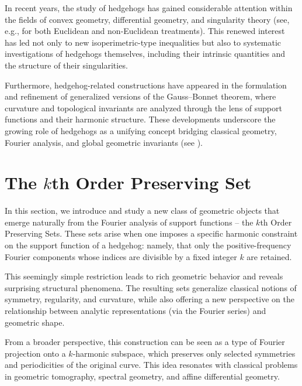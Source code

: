 \documentclass{amsart}
\theoremstyle{definition}
\numberwithin{equation}{section}
\begin{document}
In recent years, the study of hedgehogs has gained considerable attention within the
fields of convex geometry, differential geometry, and singularity theory (see, e.g., 
\cite{kwong, MMYLorentzian, MMYDR, Dominika, Mozgawa, Rochera2, Rochera1, SC1, Taba, Z2, ZCWMS} for both
Euclidean and non-Euclidean treatments). This renewed interest has led not only to new isoperimetric-type inequalities but also to systematic investigations of hedgehogs themselves, including their intrinsic quantities and the structure of their singularities.

Furthermore, hedgehog-related constructions have appeared in the formulation and refinement of generalized versions of the Gauss--Bonnet theorem, where curvature and topological invariants are analyzed through the lens of support functions and their harmonic structure. These developments underscore the growing role of hedgehogs as a unifying concept bridging classical geometry, Fourier analysis, and global geometric invariants (see \cite{DZgb, Z4}).



\section{The $k$th Order Preserving Set }\label{sec3}

\noindent In this section, we introduce and study a new class of geometric objects that emerge naturally from the Fourier analysis of support functions -- the $k$th Order Preserving Sets. These sets arise when one imposes a specific harmonic constraint on the support function of a hedgehog: namely, that only the positive-frequency Fourier components whose indices are divisible by a fixed integer $k$ are retained.

This seemingly simple restriction leads to rich geometric behavior and reveals surprising structural phenomena. The resulting sets generalize classical notions of symmetry, regularity, and curvature, while also offering a new perspective on the relationship between analytic representations (via the Fourier series) and geometric shape.

From a broader perspective, this construction can be seen as a type of Fourier projection onto a $k$-harmonic subspace, which preserves only selected symmetries and periodicities of the original curve. This idea resonates with classical problems in geometric tomography, spectral geometry, and affine differential geometry.
\end{document}

